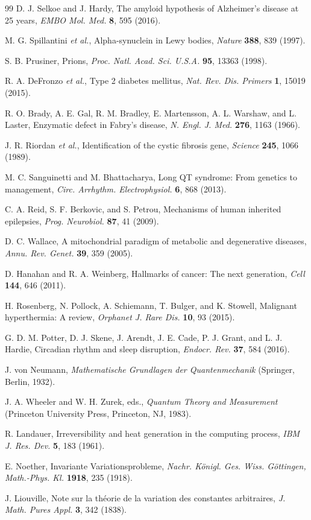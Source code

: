 \documentclass[aps,prd,twocolumn,superscriptaddress,floatfix,nofootinbib]{revtex4-2}
\theoremstyle{remark}
\begin{document}
\begin{thebibliography}{99}
D. J. Selkoe and J. Hardy, The amyloid hypothesis of Alzheimer's disease at 25 years, \textit{EMBO Mol. Med.} \textbf{8}, 595 (2016).

M. G. Spillantini \textit{et al.}, Alpha-synuclein in Lewy bodies, \textit{Nature} \textbf{388}, 839 (1997).

S. B. Prusiner, Prions, \textit{Proc. Natl. Acad. Sci. U.S.A.} \textbf{95}, 13363 (1998).

R. A. DeFronzo \textit{et al.}, Type 2 diabetes mellitus, \textit{Nat. Rev. Dis. Primers} \textbf{1}, 15019 (2015).

R. O. Brady, A. E. Gal, R. M. Bradley, E. Martensson, A. L. Warshaw, and L. Laster, Enzymatic defect in Fabry's disease, \textit{N. Engl. J. Med.} \textbf{276}, 1163 (1966).

J. R. Riordan \textit{et al.}, Identification of the cystic fibrosis gene, \textit{Science} \textbf{245}, 1066 (1989).

M. C. Sanguinetti and M. Bhattacharya, Long QT syndrome: From genetics to management, \textit{Circ. Arrhythm. Electrophysiol.} \textbf{6}, 868 (2013).

C. A. Reid, S. F. Berkovic, and S. Petrou, Mechanisms of human inherited epilepsies, \textit{Prog. Neurobiol.} \textbf{87}, 41 (2009).

D. C. Wallace, A mitochondrial paradigm of metabolic and degenerative diseases, \textit{Annu. Rev. Genet.} \textbf{39}, 359 (2005).

D. Hanahan and R. A. Weinberg, Hallmarks of cancer: The next generation, \textit{Cell} \textbf{144}, 646 (2011).

H. Rosenberg, N. Pollock, A. Schiemann, T. Bulger, and K. Stowell, Malignant hyperthermia: A review, \textit{Orphanet J. Rare Dis.} \textbf{10}, 93 (2015).

G. D. M. Potter, D. J. Skene, J. Arendt, J. E. Cade, P. J. Grant, and L. J. Hardie, Circadian rhythm and sleep disruption, \textit{Endocr. Rev.} \textbf{37}, 584 (2016).

J. von Neumann, \textit{Mathematische Grundlagen der Quantenmechanik} (Springer, Berlin, 1932).

J. A. Wheeler and W. H. Zurek, eds., \textit{Quantum Theory and Measurement} (Princeton University Press, Princeton, NJ, 1983).

R. Landauer, Irreversibility and heat generation in the computing process, \textit{IBM J. Res. Dev.} \textbf{5}, 183 (1961).

E. Noether, Invariante Variationsprobleme, \textit{Nachr. K\"{o}nigl. Ges. Wiss. G\"{o}ttingen, Math.-Phys. Kl.} \textbf{1918}, 235 (1918).

J. Liouville, Note sur la th\'{e}orie de la variation des constantes arbitraires, \textit{J. Math. Pures Appl.} \textbf{3}, 342 (1838).

\end{thebibliography}
\end{document}
